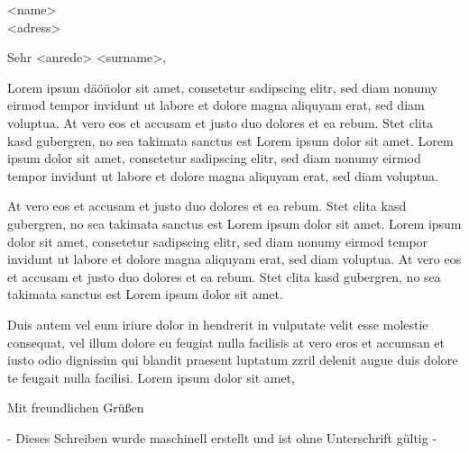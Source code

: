 \documentclass[
    sender,
    paper=a4,
    version=last,
    fontsize=11pt,
    DIV=13,
    BCOR=0mm]{scrlttr2}
\begin{document}


\begin{letter}{
    <name>\\
    <adress>\\
}
\opening{Sehr <anrede> <surname>,}

Lorem ipsum däöüolor sit amet, consetetur sadipscing elitr, sed diam nonumy eirmod tempor invidunt ut labore et dolore magna aliquyam erat, sed diam voluptua. At vero eos et accusam et justo duo dolores et ea rebum. Stet clita kasd gubergren, no sea takimata sanctus est Lorem ipsum dolor sit amet. Lorem ipsum dolor sit amet, consetetur sadipscing elitr, sed diam nonumy eirmod tempor invidunt ut labore et dolore magna aliquyam erat, sed diam voluptua. 

At vero eos et accusam et justo duo dolores et ea rebum. Stet clita kasd gubergren, no sea takimata sanctus est Lorem ipsum dolor sit amet. Lorem ipsum dolor sit amet, consetetur sadipscing elitr, sed diam nonumy eirmod tempor invidunt ut labore et dolore magna aliquyam erat, sed diam voluptua. At vero eos et accusam et justo duo dolores et ea rebum. Stet clita kasd gubergren, no sea takimata sanctus est Lorem ipsum dolor sit amet.

Duis autem vel eum iriure dolor in hendrerit in vulputate velit esse molestie consequat, vel illum dolore eu feugiat nulla facilisis at vero eros et accumsan et iusto odio dignissim qui blandit praesent luptatum zzril delenit augue duis dolore te feugait nulla facilisi. Lorem ipsum dolor sit amet,


\closing{Mit freundlichen Grüßen} %

- Dieses Schreiben wurde maschinell erstellt und ist ohne Unterschrift gültig -
\end{letter}
\end{document}
